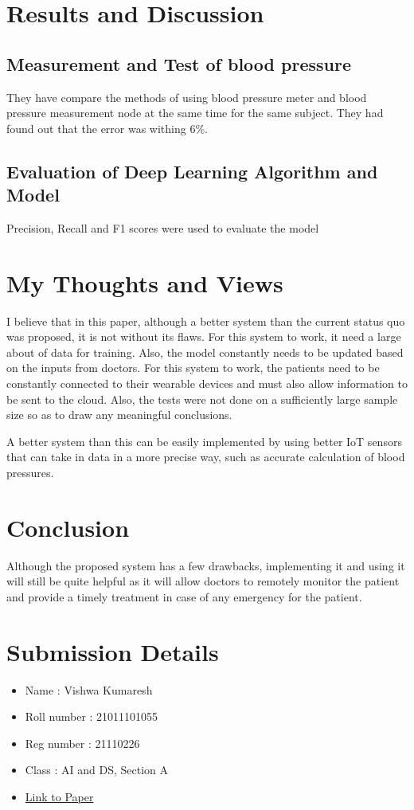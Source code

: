 \documentclass{article}
\begin{document}
\section{Results and Discussion}
\subsection{Measurement and Test of blood pressure}
They have compare the methods of using blood pressure meter and blood pressure measurement node at the same time for the same subject. They had found out that the error was withing 6\%.

\subsection{Evaluation of Deep Learning Algorithm and Model}
Precision, Recall and F1 scores were used to evaluate the model

\section{My Thoughts and Views}
I believe that in this paper, although a better system than the current status quo was proposed, it is not without its flaws. For this system to work, it need a large about of data for training. Also, the model constantly needs to be updated based on the inputs from doctors. For this system to work, the patients need to be constantly connected to their wearable devices and must also allow information to be sent to the cloud. Also, the tests were not done on a sufficiently large sample size so as to draw any meaningful conclusions.

A better system than this can be easily implemented by using better IoT sensors that can take in data in a more precise way, such as accurate calculation of blood pressures.

\section{Conclusion}
Although the proposed system has a few drawbacks, implementing it and using it will still be quite helpful as it will allow doctors to remotely monitor the patient and provide a timely treatment in case of any emergency for the patient.


\section*{Submission Details}
\begin{itemize}
    \item Name : Vishwa Kumaresh
    \item Roll number : 21011101055
    \item Reg number : 21110226
    \item Class : AI and DS, Section A
    \item \href{https://www.hindawi.com/journals/jhe/2021/4109102/}{Link to Paper}
\end{itemize}
\end{document}

